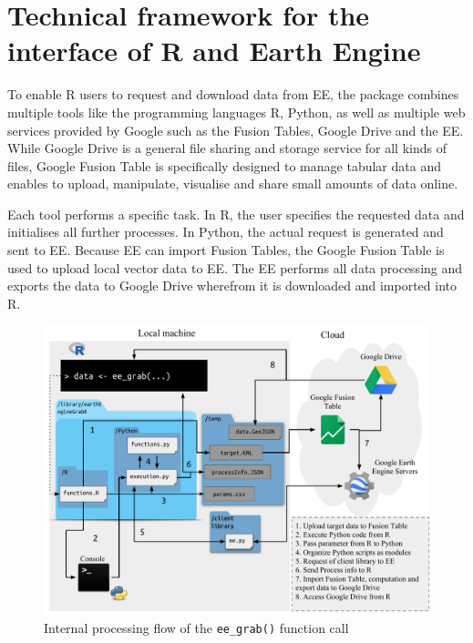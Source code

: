 \section{Technical framework for the interface of R and Earth Engine}

To enable R users to request and download data from EE, the package combines multiple tools like the programming languages R, Python, as well as multiple web services provided by Google such as the Fusion Tables, Google Drive and the EE. While Google Drive is a general file sharing and storage service for all kinds of files, Google Fusion Table is specifically designed to manage tabular data and enables to upload, manipulate, visualise and share small amounts of data online.

Each tool performs a specific task. In R, the user specifies the requested data and initialises all further processes. In Python, the actual request is generated and sent to EE. Because EE can import Fusion Tables, the Google Fusion Table is used to upload local vector data to EE. The EE performs all data processing and exports the data to Google Drive wherefrom it is downloaded and imported into R. 

\begin{center}
	
	\begin{figure}[h]
		\begin{center}
			\includegraphics[width=15cm]{images/processing_flow_big.pdf}
			\caption{Internal processing flow of the \texttt{ee\_grab()} function call}
			\label{processingFlow}
		\end{center}
	\end{figure}
\end{center}

